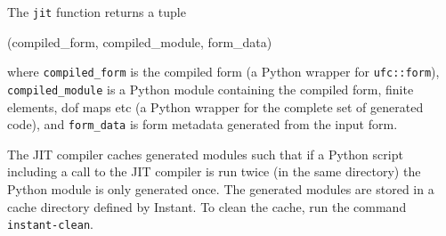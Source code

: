 The \texttt{jit} function returns a tuple
\begin{code}
(compiled_form, compiled_module, form_data)
\end{code}
where \texttt{compiled\_form} is the compiled form (a Python wrapper
for \texttt{ufc::form}), \texttt{compiled\_module} is a Python module
containing the compiled form, finite elements, dof maps etc (a Python
wrapper for the complete set of generated code), and
\texttt{form\_data} is form metadata generated from the input form.

The JIT compiler caches generated modules such that if a Python script
including a call to the JIT compiler is run twice (in the same
directory) the Python module is only generated once. The generated
modules are stored in a cache directory defined by Instant. To clean
the cache, run the command \texttt{instant-clean}.
